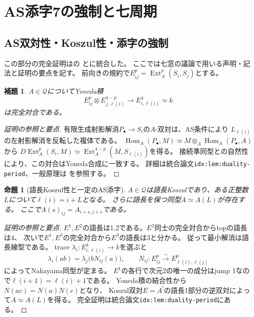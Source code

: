 \documentclass[11pt,a4paper]{ltjsarticle}
\newtheorem{proposition}[theorem]{命題}
\newtheorem{lemma}[theorem]{補題}
\theoremstyle{definition}
\newcommand{\Ext}{\operatorname{Ext}}
\newcommand{\Hom}{\operatorname{Hom}}
\begin{document}
\section{AS添字7の強制と七周期}
\subsection{AS双対性・Koszul性・添字の強制}
この部分の完全証明はの
とに統合した。
ここでは七窓の議論で用いる声明・記法と証明の要点を記す。
前向きの規約で$E_{ij}^p=\Ext_A^p(S_i,S_j)$とする。

\begin{lemma}\label{lem:frobenius}
$A\in\mathcal Q$についてYoneda積
\[
E_{ij}^p\otimes E_{j,\ell(i)}^{4-p}\longrightarrow E_{i,\ell(i)}^4\simeq k
\]
は完全対合である。
\end{lemma}
\begin{proof}[証明の参照と要点]
有限生成射影解消$P_\bullet\to S_i$の$A$-双対は、AS条件により
$L_{\ell(i)}$の左射影解消を反転した複体である。
$\Hom_A(P_\bullet,M)\simeq M\otimes_A\Hom_A(P_\bullet,A)$から
$D\Ext_A^p(S_i,M)\simeq\Ext_A^{4-p}(M,S_{\ell(i)})$を得る。
接続準同型との自然性により、この対合はYoneda合成に一致する。
詳細は統合論文\texttt{idx:lem:duality-period}、一般原理は
\cite[Lemma 6.1(b), Theorem 6.2]{MVS}を参照する。
\end{proof}

\begin{proposition}[語長Koszul性と一定のAS添字]\label{prop:general-koszul}
$A\in\mathcal Q$は語長Koszulであり、ある正整数$L$について$\ell(i)=i+L$となる。
さらに語長を保つ同型$A\simeq A(L)$が存在する。
ここで$A(s)_{ij}=A_{i+s,j+s}$である。
\end{proposition}
\begin{proof}[証明の参照と要点]
$E^1,E^2$の語長は1,2である。$E^2$同士の完全対合からtopの語長は4、
次いで$E^1,E^3$の完全対合から$E^3$の語長は3と分かる。
従って最小解消は語長線型である。
trace $\lambda_i:E_{i,\ell(i)}^4\to k$を選ぶと
\begin{equation}\label{eq:nakayama}
\lambda_i(ab)=\lambda_j\bigl(bN_{ij}(a)\bigr),\qquad
N_{ij}:E_{ij}^p\xrightarrow{\sim}E_{\ell(i),\ell(j)}^p
\end{equation}
によってNakayama同型が定まる。
$E^1$の各行で次元2の唯一の成分はjump 1なので$\ell(i+1)=\ell(i)+1$である。
Yoneda積の結合性から$N(ac)=N(a)N(c)$となり、
Koszul双対$E=A^!$の語長1部分の逆双対によって$A\simeq A(L)$を得る。
完全証明は統合論文\texttt{idx:lem:duality-period}にある。
\end{proof}
\end{document}
